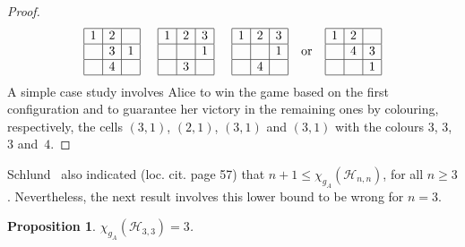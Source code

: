 \documentclass{article}
\newtheorem{prop}[thm]{Proposition}
\newcommand{\chia}{\ensuremath{\chi_{g_A}}}
\begin{document}
\begin{proof}
$$\begin{array}{|c|c|c|} \hline
1 & 2 & \ \\ \hline
\ & 3 & 1 \\ \hline
\ & 4 & \ \\ \hline
\end{array}\hspace{0.5cm}
\begin{array}{|c|c|c|} \hline
1 & 2 & 3 \\ \hline
\ & \ & 1 \\ \hline
\ & 3 & \ \\ \hline
\end{array}\hspace{0.5cm}
\begin{array}{|c|c|c|} \hline
1 & 2 & 3 \\ \hline
\ & \ & 1 \\ \hline
\ & 4 & \ \\ \hline
\end{array}
\hspace{0.25cm} \text{ or } \hspace{0.25cm}
\begin{array}{|c|c|c|} \hline
1 & 2 & \ \\ \hline
\ & 4 & 3 \\ \hline
\ & \ & 1 \\ \hline
\end{array}$$
 A simple case study involves Alice to win the game based on the first configuration and to guarantee her victory in the remaining ones by colouring, respectively, the cells $(3,1)$, $(2,1)$, $(3,1)$ and $(3,1)$  with 
the colours $3$, $3$, $3$ and~$4$.
\end{proof}

Schlund~\cite{Schlund2011} also indicated (loc. cit. page 57) that $n+1\leq \chi_{g_A}(\mathcal{H}_{n,n})$, for all $n\geq 3$. Nevertheless, the next result involves this lower bound 
to be wrong 
for $n=3$.

\begin{prop} \label{prop_Hnn_2} $\chia(\mathcal{H}_{3,3})=3$.
\end{prop}
\end{document}

